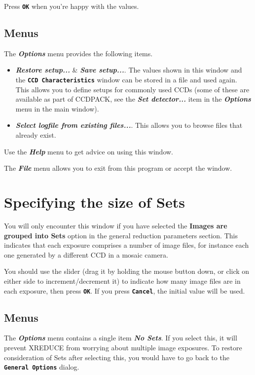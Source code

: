 \documentclass[11pt]{article}
\newcommand{\htmlref}[2]{#1}
\newcommand{\xlabel}[1]{}
\newcommand{\butt}[1]{{\bf \tt #1}}
\newcommand{\menu}[1]{{\bf \em #1}}
\newcommand{\wlab}[1]{{\bf #1}}
\begin{document}
Press \butt{OK} when you're happy with the values.

\subsection{Menus \xlabel{CCDSetGenGlobalsMenu}}

The \menu{Options} menu provides the following items.
\begin{itemize}
\item \menu{Restore setup...} \& \menu{Save setup...}. The values
shown in this window and the \butt{CCD Characteristics} window can be
stored in a file and used again. This allows you to define setups for
commonly used CCDs (some of these are available as part of CCDPACK,
see the
\htmlref{\menu{Set detector...}}{CCDSetDetectorWindow}
item in the \menu{Options} menu in the main window).

\item \menu{Select logfile from existing files...}. This allows you to
browse files that already exist.

\end{itemize}

Use the \menu{Help} menu to get advice on using this window.

The \menu{File} menu allows you to exit from this program or
accept the window.

\section{Specifying the size of Sets\xlabel{CCDGetSetIndicesWindow}}

You will only encounter this window if you have selected the
\wlab{Images are grouped into Sets} option in the general
reduction parameters section.  This indicates that each exposure
comprises a number of image files, for instance each one generated by
a different CCD in a mosaic camera.

You should use the slider (drag it by holding the mouse button down,
or click on either side to increment/decrement it) to indicate 
how many image files are in each exposure, then press \butt{OK}.  
If you press \butt{Cancel}, the initial value will be used.

\subsection{Menus \xlabel{CCDGetSetIndicesMenu}}
The \menu{Options} menu contains a single item \menu{No Sets}.
If you select this, it will prevent XREDUCE from worrying about
multiple image exposures.  To restore consideration of Sets
after selecting this, you would have to go back to the 
\htmlref{\butt{General Options}}{CCDSetGenGlobalsWindow} dialog.
\end{document}
